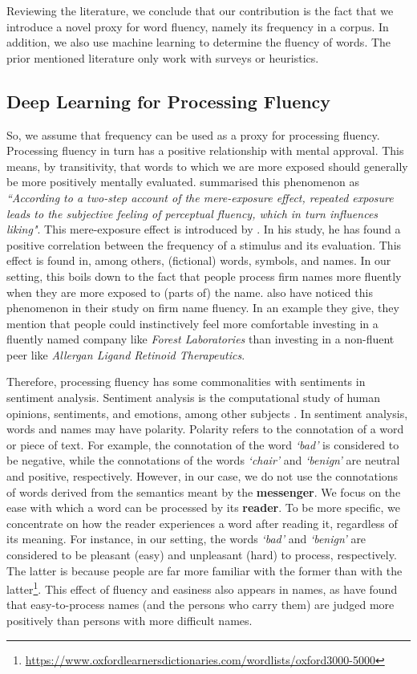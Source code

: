 \documentclass[11pt]{article}
\begin{document}
Reviewing the literature, we conclude that our contribution is the fact that we introduce a novel proxy for word fluency, namely its frequency in a corpus. In addition, we also use machine learning to determine the fluency of words. The prior mentioned literature only work with surveys or heuristics.


\newpage
\subsection{Deep Learning for Processing Fluency}
So, we assume that frequency can be used as a proxy for processing fluency. Processing fluency in turn has a positive relationship with mental approval. This means, by transitivity, that words to which we are more exposed should generally be more positively mentally evaluated. \cite{reber1998effects} summarised this phenomenon as  \textit{``According to a two-step account of the mere-exposure effect, repeated exposure leads to the subjective feeling of perceptual fluency, which in turn influences liking"}. This mere-exposure effect is introduced by \cite{zajonc1968attitudinal}. In his study, he has found a positive correlation between the frequency of a stimulus and its evaluation. This effect is found in, among others, (fictional) words, symbols, and names. In our setting, this boils down to the fact that people process firm names more fluently when they are more exposed to (parts of) the name. \cite{green2013company} also have noticed this phenomenon in their study on firm name fluency. In an example they give, they mention that people could instinctively feel more comfortable investing in a fluently named company like \textit{Forest Laboratories} than investing in a non-fluent peer like \textit{Allergan Ligand Retinoid Therapeutics}.

Therefore, processing fluency has some commonalities with sentiments in sentiment analysis. Sentiment analysis is the computational study of human opinions, sentiments, and emotions, among other subjects \citep{liu2020sentiment}. In sentiment analysis, words and names may have polarity. Polarity refers to the connotation of a word or piece of text. For example, the connotation of the word \textit{`bad'} is considered to be negative, while the connotations of the words \textit{`chair'} and \textit{`benign'} are neutral and positive, respectively. However, in our case, we do not use the connotations of words derived from the semantics meant by the \textbf{messenger}. We focus on the ease with which a word can be processed by its \textbf{reader}. To be more specific, we concentrate on how the reader experiences a word after reading it, regardless of its meaning. For instance, in our setting, the words \textit{`bad'} and \textit{`benign'} are considered to be pleasant (easy) and unpleasant (hard) to process, respectively. The latter is because people are far more familiar with the former than with the latter\footnote{\url{https://www.oxfordlearnersdictionaries.com/wordlists/oxford3000-5000}}. This effect of fluency and easiness also appears in names, as  \cite{laham2012name} have found that easy-to-process names (and the persons who carry them) are judged more positively than persons with more difficult names.
\end{document}
